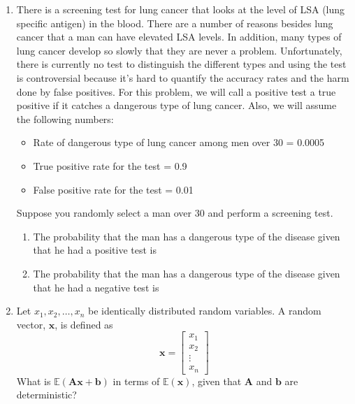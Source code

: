 \documentclass [11pt] {article}
\newcommand{\x}{\bf{x}}
\newcommand{\A}{\bf{A}}
\renewcommand{\bf}[1]{\textbf{{#1}}}
\begin{document}
\begin{enumerate}
\begin{enumerate}
                \hrule \vspace{10pt}

                \hrule

            \item There is a screening test for lung cancer that looks at the level of LSA (lung
                specific antigen) in the blood. There are a number of reasons besides lung cancer 
                that a man can have elevated LSA levels. In addition, many types of lung cancer 
                develop so slowly that they are never a problem. Unfortunately, there is currently 
                no test to distinguish the different types and using the test is controversial 
                because it’s hard to quantify the accuracy rates and the harm done by false 
                positives. For this problem, we will call a positive test a true positive if it 
                catches a dangerous type of lung cancer. Also, we will assume the following numbers:
                \begin{itemize}
                    \item Rate of dangerous type of lung cancer among men over 30 = 0.0005
                    \item True positive rate for the test = 0.9
                    \item False positive rate for the test = 0.01
                \end{itemize}
                Suppose you randomly select a man over 30 and perform a screening test.
                \begin{enumerate}[itemsep=10pt]
                    \item The probability that the man has a dangerous type of the disease given 
                        that he had a positive test is
                    \item The probability that the man has a dangerous type of the disease given 
                        that he had a negative test is
                \end{enumerate}

            \item Let $x_1, x_2, \ldots, x_n$ be identically distributed random variables. A random
                vector, $\x$, is defined as
                \[\x = \begin{bmatrix} x_1 \\ x_2 \\ \vdots \\ x_n \end{bmatrix}\]
                What is $\mathbb{E}(\A \x + \bf{b})$ in terms of $\mathbb{E}(\x)$, given that
                $\A$ and $\bf{b}$ are deterministic?


\end{enumerate}
\end{enumerate}
\end{document}

